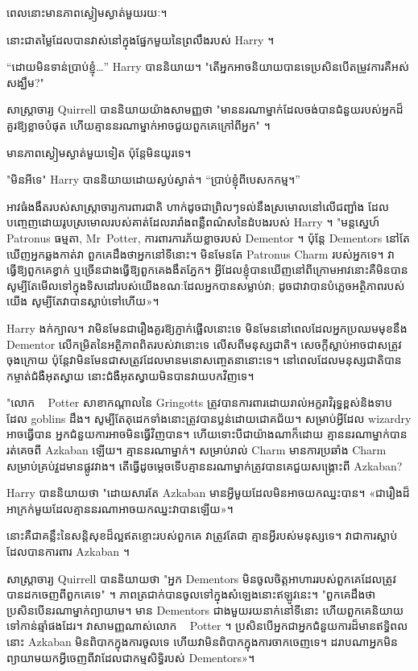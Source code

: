 {{{{ពេលនោះមានភាពស្ងៀមស្ងាត់មួយរយៈ។

នោះ​ជា​តម្លៃ​ដែល​បាន​វាស់​នៅ​ក្នុង​ផ្នែក​មួយ​នៃ​ព្រលឹង​របស់ Harry ។

“ដោយមិនទាន់ប្រាប់ខ្ញុំ…” Harry បាននិយាយ។ "តើអ្នកអាចនិយាយបានទេប្រសិនបើតម្រូវការគឺអស់សង្ឃឹម?"

សាស្ត្រាចារ្យ Quirrell បាននិយាយយ៉ាងសាមញ្ញថា "មាននរណាម្នាក់ដែលចង់បានជំនួយរបស់អ្នកដ៏គួរឱ្យខ្លាចបំផុត ហើយគ្មាននរណាម្នាក់អាចជួយពួកគេក្រៅពីអ្នក" ។

មាន​ភាព​ស្ងៀមស្ងាត់​មួយ​ទៀត ប៉ុន្តែ​មិន​យូរ​ទេ។

"មិនអីទេ" Harry បាននិយាយដោយស្ងប់ស្ងាត់។ “ប្រាប់ខ្ញុំពីបេសកកម្ម។”

អាវធំងងឹតរបស់សាស្ត្រាចារ្យការពារជាតិ ហាក់ដូចជាព្រិលៗទល់នឹងស្រមោលនៅលើជញ្ជាំង ដែលបញ្ចេញដោយរូបស្រមោលរបស់គាត់ដែលរារាំងពន្លឺពណ៌សនៃដំបងរបស់ Harry ។ "មន្តស្នេហ៍ Patronus ធម្មតា, Mr~Potter, ការពារការភ័យខ្លាចរបស់ Dementor ។ ប៉ុន្តែ Dementors នៅតែឃើញអ្នកឆ្លងកាត់វា ពួកគេដឹងថាអ្នកនៅទីនោះ។ មិនមែនតែ Patronus Charm របស់អ្នកទេ។ វាធ្វើឱ្យពួកគេខ្វាក់ ឬច្រើនជាងធ្វើឱ្យពួកគេងងឹតភ្នែក។ អ្វី​ដែល​ខ្ញុំ​បាន​ឃើញ​នៅ​ពី​ក្រោម​អាវ​នោះ​គឺ​មិន​បាន​សូម្បី​តែ​មើល​ទៅ​ក្នុង​ទិសដៅ​របស់​យើង​ខណៈ​ដែល​អ្នក​បាន​សម្លាប់​វា; ដូច​ជា​វា​បាន​បំភ្លេច​អត្ថិភាព​របស់​យើង សូម្បី​តែ​វា​បាន​ស្លាប់​ទៅ​ហើយ»។

Harry ងក់ក្បាល។ វាមិនមែនជារឿងគួរឱ្យភ្ញាក់ផ្អើលនោះទេ មិនមែននៅពេលដែលអ្នកប្រឈមមុខនឹង Dementor លើកម្រិតនៃអត្ថិភាពពិតរបស់វានោះទេ លើសពីមនុស្សជាតិ។ សេចក្តីស្លាប់អាចជាសត្រូវចុងក្រោយ ប៉ុន្តែវាមិនមែនជាសត្រូវដែលមានមនោសញ្ចេតនានោះទេ។ នៅពេលដែលមនុស្សជាតិបានកម្ចាត់ជំងឺអុតស្វាយ នោះជំងឺអុតស្វាយមិនបានវាយបកវិញទេ។

"លោក ~ Potter សាខាកណ្តាលនៃ Gringotts ត្រូវបានការពារដោយរាល់អក្ខរាវិរុទ្ធខ្ពស់និងទាបដែល goblins ដឹង។ សូម្បីតែតុដេកទាំងនោះត្រូវបានប្លន់ដោយជោគជ័យ។ សម្រាប់អ្វីដែល wizardry អាចធ្វើបាន អ្នកជំនួយការអាចមិនធ្វើវិញបាន។ ហើយ​ទោះ​បី​ជា​យ៉ាង​ណា​ក៏​ដោយ គ្មាន​នរណា​ម្នាក់​បាន​រត់​គេច​ពី Azkaban ឡើយ។ គ្មាននរណាម្នាក់។ សម្រាប់រាល់ Charm មានការប្រឆាំង Charm សម្រាប់គ្រប់វួដមានផ្លូវវាង។ តើ​ធ្វើ​ដូចម្តេច​ទើប​គ្មាន​នរណា​ម្នាក់​ត្រូវ​បាន​គេ​ជួយ​សង្គ្រោះ​ពី Azkaban?

Harry បាននិយាយថា "ដោយសារតែ Azkaban មានអ្វីមួយដែលមិនអាចយកឈ្នះបាន។ «​ជា​រឿង​ដ៏​អាក្រក់​មួយ​ដែល​គ្មាន​នរណា​អាច​យកឈ្នះ​វា​បាន​ឡើយ​»​។

នោះគឺជាគន្លឹះនៃសន្តិសុខដ៏ល្អឥតខ្ចោះរបស់ពួកគេ វាត្រូវតែជា គ្មានអ្វីរបស់មនុស្សទេ។ វាជាការស្លាប់ដែលបានការពារ Azkaban ។

សាស្ត្រាចារ្យ Quirrell បាននិយាយថា "អ្នក Dementors មិនចូលចិត្តអាហាររបស់ពួកគេដែលត្រូវបានដកចេញពីពួកគេទេ" ។ ភាពត្រជាក់បានចូលទៅក្នុងសំឡេងនោះឥឡូវនេះ។ "ពួកគេដឹងថាប្រសិនបើនរណាម្នាក់ព្យាយាម។ មាន Dementors ជាងមួយរយនាក់នៅទីនោះ ហើយពួកគេនិយាយទៅកាន់ឆ្មាំផងដែរ។ វាសាមញ្ញណាស់លោក ~ Potter ។ ប្រសិនបើអ្នកជាអ្នកជំនួយការដ៏មានឥទ្ធិពលនោះ Azkaban មិនពិបាកក្នុងការចូលទេ ហើយវាមិនពិបាកក្នុងការចាកចេញទេ។ ដរាបណា​អ្នក​មិន​ព្យាយាម​យក​អ្វី​ចេញពី​វា​ដែលជា​កម្មសិទ្ធិ​របស់ Dementors»។

}}}}
